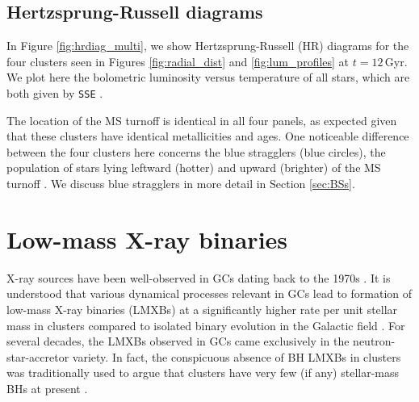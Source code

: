 \documentclass[twocolumn,tighten]{aastex63}
\begin{document}
\subsection{Hertzsprung-Russell diagrams}
\label{sec:HRdiagrams}

In Figure \ref{fig:hrdiag_multi}, we show Hertzsprung-Russell (HR) diagrams for the four clusters seen in Figures \ref{fig:radial_dist} and \ref{fig:lum_profiles} at $t=12\,$Gyr. We plot here the bolometric luminosity versus temperature of all stars, which are both given by \texttt{SSE} \citep[see][for further details]{Hurley2000}.

The location of the MS turnoff \citep[defined as in][]{Weatherford2018} is identical in all four panels, as expected given that these clusters have identical metallicities and ages. One noticeable difference between the four clusters here concerns the blue stragglers (blue circles), the population of stars lying leftward (hotter) and upward (brighter) of the MS turnoff \citep[e.g.,][]{Sandage1953}. We discuss blue stragglers in more detail in Section \ref{sec:BSs}.

\section{Low-mass X-ray binaries}
\label{sec:XRBs}

X-ray sources have been well-observed in GCs dating back to the 1970s \citep{Clark1975,Heinke2010}. It is understood that various dynamical processes relevant in GCs lead to formation of low-mass X-ray binaries (LMXBs) at a significantly higher rate per unit stellar mass in clusters compared to isolated binary evolution in the Galactic field \citep[e.g.,][]{Clark1975}. For several decades, the LMXBs observed in GCs came exclusively in the neutron-star-accretor variety. In fact, the conspicuous absence of BH LMXBs in clusters was traditionally used to argue that clusters have very few (if any) stellar-mass BHs at present \citep[e.g.,][]{Kulkarni1993}.
\end{document}
